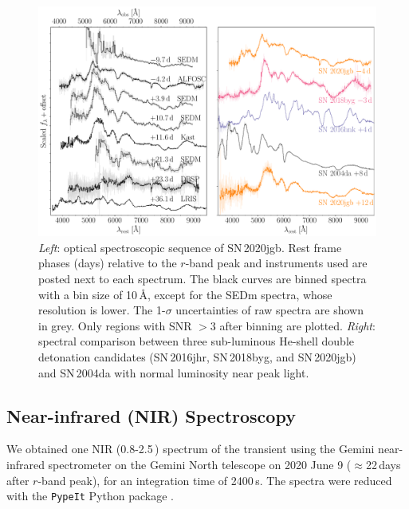 \documentclass[twocolumn]{aastex631}
\newcommand\sn{SN\,2020jgb}
\begin{document}

\begin{figure}
    \centering
    \includegraphics[width=\textwidth]{optical_spec_evolution.pdf}
    \caption{\textit{Left}: optical spectroscopic sequence of \sn. Rest frame phases (days) relative to the $r$-band peak and instruments used are posted next to each spectrum. The black curves are binned spectra with a bin size of 10\,\r{A}, except for the SEDm spectra, whose resolution is lower. The 1-$\sigma$ uncertainties of raw spectra are shown in grey. Only regions with SNR $>3$ after binning are plotted. \textit{Right}: spectral comparison between three sub-luminous He-shell double detonation candidates (SN\,2016jhr, SN\,2018byg, and \sn) and SN\,2004da with normal luminosity near peak light.} %
    \label{fig:spec_evo}
\end{figure}

\subsection{Near-infrared (NIR) Spectroscopy}
We obtained one NIR (0.8-2.5\,\micron) spectrum of the transient using the Gemini near-infrared spectrometer \citep[GNIRS;][]{GNIRS1998} on the Gemini North telescope on 2020 June 9 ($\approx$22\,days after $r$-band peak), for an integration time of 2400\,s. The spectra were reduced with the \texttt{PypeIt} Python package \citep{pypeit:joss_pub,pypeit:zenodo}.
\end{document}
